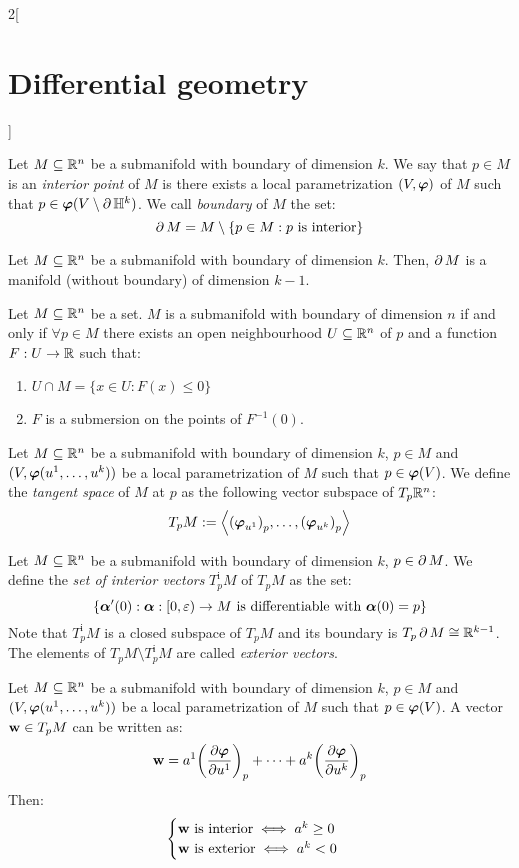 \documentclass[../../../main_math.tex]{subfiles}
\begin{document}
\begin{multicols}{2}[\section{Differential geometry}]
\begin{lemma}
  \end{lemma}
  \begin{definition}
    Let $M\subseteq\mathbb{R}^n$ be a submanifold with boundary of dimension $k$. We say that $p\in M$ is an \emph{interior point} of $M$ is there exists a local parametrization $(V,\boldsymbol{\mathrm{\varphi}})$ of $M$ such that $p\in\boldsymbol{\mathrm{\varphi}}(V\setminus\operatorname{\partial}{\mathbb{H}^k})$. We call \emph{boundary} of $M$ the set: $$\operatorname{\partial}{M}=M\setminus\{p\in M:p\text{ is interior}\}$$
  \end{definition}
  \begin{proposition}
    Let $M\subseteq\mathbb{R}^n$ be a submanifold with boundary of dimension $k$. Then, $\operatorname{\partial}{M}$ is a manifold (without boundary) of dimension $k-1$.
  \end{proposition}
  \begin{proposition}
    Let $M\subseteq\mathbb{R}^n$ be a set. $M$ is a submanifold with boundary of dimension $n$ if and only if $\forall p\in M$ there exists an open neighbourhood $U\subseteq \mathbb{R}^n$ of $p$ and a function $F:U\rightarrow\mathbb{R}$ such that:
    \begin{enumerate}
      \item $U\cap M=\{x\in U:F(x)\leq 0\}$
      \item $F$ is a submersion on the points of $F^{-1}(0)$.
    \end{enumerate}
  \end{proposition}
  \begin{definition}
    Let $M\subseteq\mathbb{R}^n$ be a submanifold with boundary of dimension $k$, $p\in M$ and $(V,\boldsymbol{\mathrm{\varphi}}(u^1,\ldots,u^k))$ be a local parametrization of $M$ such that $p\in\boldsymbol{\mathrm{\varphi}}(V)$. We define the \emph{tangent space} of $M$ at $p$ as the following vector subspace of $T_p\mathbb{R}^n$: $$T_pM:=\left\langle{\left(\boldsymbol{\mathrm{\varphi}}_{u^1}\right)}_p,\ldots,{\left(\boldsymbol{\mathrm{\varphi}}_{u^k}\right)}_p\right\rangle$$
  \end{definition}
  \begin{definition}
    Let $M\subseteq\mathbb{R}^n$ be a submanifold with boundary of dimension $k$, $p\in \operatorname{\partial}{M}$. We define the \emph{set of interior vectors} $T_p^\text{i}M$ of $T_pM$ as the set:
    $$\{\boldsymbol{\mathrm{\alpha}}'(0):\boldsymbol{\mathrm{\alpha}}:[0,\varepsilon)\rightarrow M\text{ is differentiable with }\boldsymbol{\mathrm{\alpha}}(0)=p\}$$
    Note that $T_p^\text{i}M$ is a closed subspace of $T_pM$ and its boundary is $T_p\operatorname{\partial}{M}\cong\mathbb{R}^{k-1}$.
    The elements of $T_pM\setminus T_p^\text{i}M$ are called \emph{exterior vectors}.
  \end{definition}
  \begin{lemma}
    Let $M\subseteq\mathbb{R}^n$ be a submanifold with boundary of dimension $k$, $p\in M$ and $(V,\boldsymbol{\mathrm{\varphi}}(u^1,\ldots,u^k))$ be a local parametrization of $M$ such that $p\in\boldsymbol{\mathrm{\varphi}}(V)$. A vector $\boldsymbol{\mathrm{w}}\in T_pM$ can be written as: $$\boldsymbol{\mathrm{w}}=a^1{\left(\pdv{\boldsymbol{\mathrm{\varphi}}}{u^1}\right)}_p+\cdots+a^k{\left(\pdv{\boldsymbol{\mathrm{\varphi}}}{u^k}\right)}_p$$ Then:
    $$
      \begin{cases}
        \boldsymbol{\mathrm{w}}\text{ is interior}\iff a^k\geq 0 \\
        \boldsymbol{\mathrm{w}}\text{ is exterior}\iff a^k< 0    \\
      \end{cases}
    $$
  \end{lemma}

\end{multicols}
\end{document}
